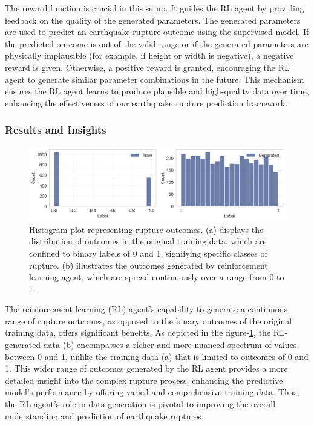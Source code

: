 \documentclass{article}
\begin{document}
The reward function is crucial in this setup. It guides the RL agent by providing feedback on the quality of the generated parameters. The generated parameters are used to predict an earthquake rupture outcome using the supervised model. If the predicted outcome is out of the valid range or if the generated parameters are physically implausible (for example, if height or width is negative), a negative reward is given. Otherwise, a positive reward is granted, encouraging the RL agent to generate similar parameter combinations in the future. This mechanism ensures the RL agent learns to produce plausible and high-quality data over time, enhancing the effectiveness of our earthquake rupture prediction framework.



\subsubsection{Results and Insights}
\begin{figure}[ht]
    \begin{center}
        \includegraphics[scale=0.5]{figures/label_histogram.png}
    \end{center}
    \caption{Histogram plot representing rupture outcomes. (a) displays the distribution of outcomes in the original training data, which are confined to binary labels of 0 and 1, signifying specific classes of rupture. (b) illustrates the outcomes generated by reinforcement learning agent, which are spread continuously over a range from 0 to 1.}
    \label{fig:label_distribution}
\end{figure}

The reinforcement learning (RL) agent's capability to generate a continuous range of rupture outcomes, as opposed to the binary outcomes of the original training data, offers significant benefits. As depicted in the figure-\ref{fig:label_distribution}, the RL-generated data (b) encompasses a richer and more nuanced spectrum of values between 0 and 1, unlike the training data (a) that is limited to outcomes of 0 and 1. This wider range of outcomes generated by the RL agent provides a more detailed insight into the complex rupture process, enhancing the predictive model's performance by offering varied and comprehensive training data. Thus, the RL agent's role in data generation is pivotal to improving the overall understanding and prediction of earthquake ruptures.
\end{document}
